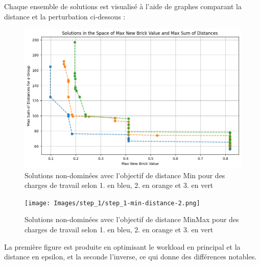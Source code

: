 Chaque ensemble de solutions est visualisé à l’aide de graphes comparant la distance et la perturbation ci-dessous :

\begin{figure}[H]
    \centering
    \includegraphics[width=\textwidth]{Images/step_1/step_1-min-distance.png}
    \caption{Solutions non-dominées avec l'objectif de distance Min pour des charges de travail selon 1. en bleu, 2. en orange et 3. en vert}
    \label{fig:nom_de_reference}
\end{figure}

\begin{figure}[H]
    \centering
    \texttt{[image: Images/step\_1/step\_1-min-distance-2.png]}
    \caption{Solutions non-dominées avec l'objectif de distance MinMax pour des charges de travail selon 1. en bleu, 2. en orange et 3. en vert}
    \label{fig:nom_de_reference}
\end{figure}

La première figure est produite en optimisant le workload en principal et la distance en epsilon, et la seconde l'inverse, ce qui donne des différences notables.